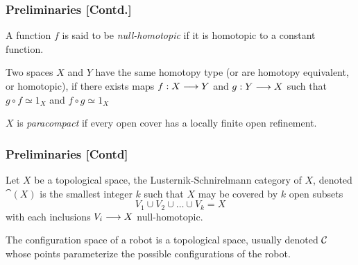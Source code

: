 \documentclass{beamer}
\begin{document}
\begin{frame}
    \frametitle{Preliminaries [Contd.]}
    \begin{defn}
        A function $f$ is said to be \textit{null-homotopic} if it is homotopic to a constant function.
    \end{defn}

    \begin{defn}
        Two spaces $X$ and $Y$ have the same homotopy type (or are homotopy equivalent, or homotopic), if there exists maps $f: X \longrightarrow Y$ and $g : Y \longrightarrow X$
        such that $g \circ f \simeq 1_X$ and $f \circ g \simeq 1_X$
    \end{defn}

    \begin{defn}
        $X$ is \textit{paracompact} if every open cover has a locally finite open refinement.
    \end{defn}
\end{frame}

\begin{frame}
    \frametitle{Preliminaries [Contd]}
    \begin{defn}
        Let $X$ be a topological space, the Lusternik-Schnirelmann category of $X$, denoted $\cat(X)$ is the smallest integer $k$ such that $X$ may be covered by $k$ open subsets
        \[
            V_1 \cup V_2 \cup \ldots \cup V_k = X
        \]
        with each inclusions $V_i \longrightarrow X$ null-homotopic.
    \end{defn}
    \begin{defn}
        The configuration space of a robot is a topological space, usually denoted $\cal{C}$ whose points parameterize the possible configurations of the robot.
    \end{defn}

\end{frame}


\end{document}
